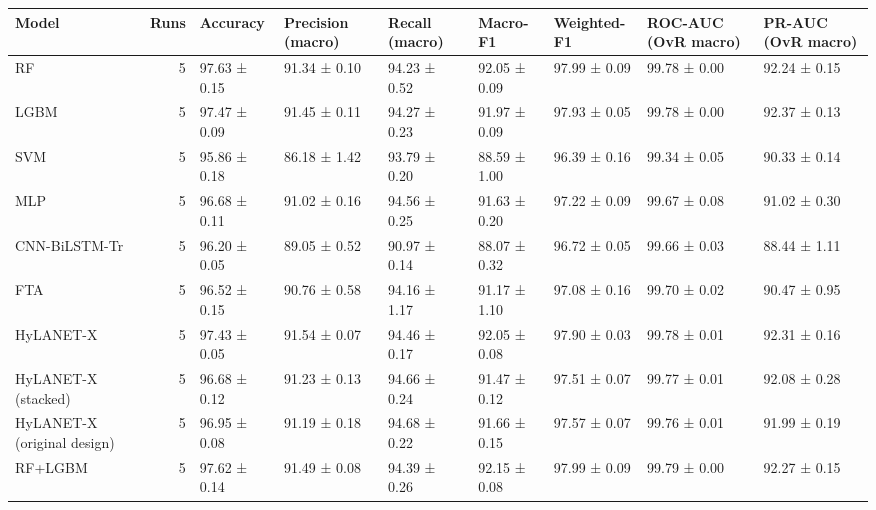 \begin{tabular}{lrlllllll}
\toprule
Model & Runs & Accuracy & Precision (macro) & Recall (macro) & Macro-F1 & Weighted-F1 & ROC-AUC (OvR macro) & PR-AUC (OvR macro) \\
\midrule
RF & 5 & 97.63 ± 0.15 & 91.34 ± 0.10 & 94.23 ± 0.52 & 92.05 ± 0.09 & 97.99 ± 0.09 & 99.78 ± 0.00 & 92.24 ± 0.15 \\
LGBM & 5 & 97.47 ± 0.09 & 91.45 ± 0.11 & 94.27 ± 0.23 & 91.97 ± 0.09 & 97.93 ± 0.05 & 99.78 ± 0.00 & 92.37 ± 0.13 \\
SVM & 5 & 95.86 ± 0.18 & 86.18 ± 1.42 & 93.79 ± 0.20 & 88.59 ± 1.00 & 96.39 ± 0.16 & 99.34 ± 0.05 & 90.33 ± 0.14 \\
MLP & 5 & 96.68 ± 0.11 & 91.02 ± 0.16 & 94.56 ± 0.25 & 91.63 ± 0.20 & 97.22 ± 0.09 & 99.67 ± 0.08 & 91.02 ± 0.30 \\
CNN-BiLSTM-Tr & 5 & 96.20 ± 0.05 & 89.05 ± 0.52 & 90.97 ± 0.14 & 88.07 ± 0.32 & 96.72 ± 0.05 & 99.66 ± 0.03 & 88.44 ± 1.11 \\
FTA & 5 & 96.52 ± 0.15 & 90.76 ± 0.58 & 94.16 ± 1.17 & 91.17 ± 1.10 & 97.08 ± 0.16 & 99.70 ± 0.02 & 90.47 ± 0.95 \\
HyLANET-X & 5 & 97.43 ± 0.05 & 91.54 ± 0.07 & 94.46 ± 0.17 & 92.05 ± 0.08 & 97.90 ± 0.03 & 99.78 ± 0.01 & 92.31 ± 0.16 \\
HyLANET-X (stacked) & 5 & 96.68 ± 0.12 & 91.23 ± 0.13 & 94.66 ± 0.24 & 91.47 ± 0.12 & 97.51 ± 0.07 & 99.77 ± 0.01 & 92.08 ± 0.28 \\
HyLANET-X (original design) & 5 & 96.95 ± 0.08 & 91.19 ± 0.18 & 94.68 ± 0.22 & 91.66 ± 0.15 & 97.57 ± 0.07 & 99.76 ± 0.01 & 91.99 ± 0.19 \\
RF+LGBM & 5 & 97.62 ± 0.14 & 91.49 ± 0.08 & 94.39 ± 0.26 & 92.15 ± 0.08 & 97.99 ± 0.09 & 99.79 ± 0.00 & 92.27 ± 0.15 \\
\bottomrule
\end{tabular}
